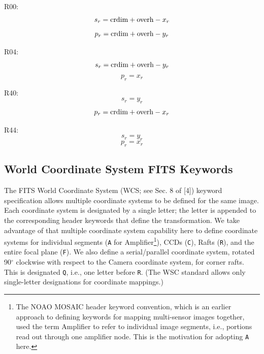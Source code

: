 \documentclass{article}[12pt]
\begin{document}
{R00:
\begin{equation}
s_r =  {\rm crdim} + {\rm overh} - x_r
\end{equation}
\begin{equation}
p_r = {\rm crdim} + {\rm overh} - y_r
\end{equation}

R04:
\begin{equation}
s_r = {\rm crdim} + {\rm overh} - y_r
\end{equation}
\begin{equation}
p_r =  x_r
\end{equation}

R40:
\begin{equation}
s_r = y_r
\end{equation}
\begin{equation}
p_r =  {\rm crdim} + {\rm overh} - x_r
\end{equation}

R44:
\begin{equation}
s_r = y_r
\end{equation}
\begin{equation}
p_r = x_r
\end{equation}

\subsection{World Coordinate System FITS Keywords}
The FITS World Coordinate System (WCS; see Sec. 8 of [4]) keyword specification allows multiple coordinate systems to be defined for the same image.  Each coordinate system is designated by a single letter; the letter is appended to the corresponding header keywords that define the transformation.  We take advantage of that multiple coordinate system capability here to define coordinate systems for individual segments ({\tt A} for Amplifier\footnote{The NOAO MOSAIC header keyword convention, which is an earlier approach to defining keywords for mapping multi-sensor images together, used the term Amplifier to refer to individual image segments, i.e., portions read out through one amplifier node.  This is the motivation for adopting {\tt A} here.}), CCDs ({\tt C}), Rafts ({\tt R}), and the entire focal plane ({\tt F}). We also define a serial/parallel coordinate system, rotated 90$^\circ$ clockwise with respect to the Camera coordinate system, for corner rafts.  This is designated  {\tt Q}, i.e., one letter before {\tt R}.  (The WSC standard allows only single-letter designations for coordinate mappings.)

}
\end{document}
